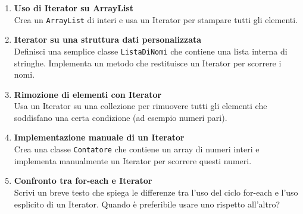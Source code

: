 \documentclass{article}
\begin{document}
\begin{enumerate}
    \item \textbf{Uso di Iterator su ArrayList} \\
    Crea un \texttt{ArrayList} di interi e usa un Iterator per stampare tutti gli elementi.

    \item \textbf{Iterator su una struttura dati personalizzata} \\
    Definisci una semplice classe \texttt{ListaDiNomi} che contiene una lista interna di stringhe. Implementa un metodo che restituisce un Iterator per scorrere i nomi.

    \item \textbf{Rimozione di elementi con Iterator} \\
    Usa un Iterator su una collezione per rimuovere tutti gli elementi che soddisfano una certa condizione (ad esempio numeri pari).

    \item \textbf{Implementazione manuale di un Iterator} \\
    Crea una classe \texttt{Contatore} che contiene un array di numeri interi e implementa manualmente un Iterator per scorrere questi numeri.

    \item \textbf{Confronto tra for-each e Iterator} \\
    Scrivi un breve testo che spiega le differenze tra l'uso del ciclo for-each e l'uso esplicito di un Iterator. Quando è preferibile usare uno rispetto all'altro?
\end{enumerate}
\end{document}
